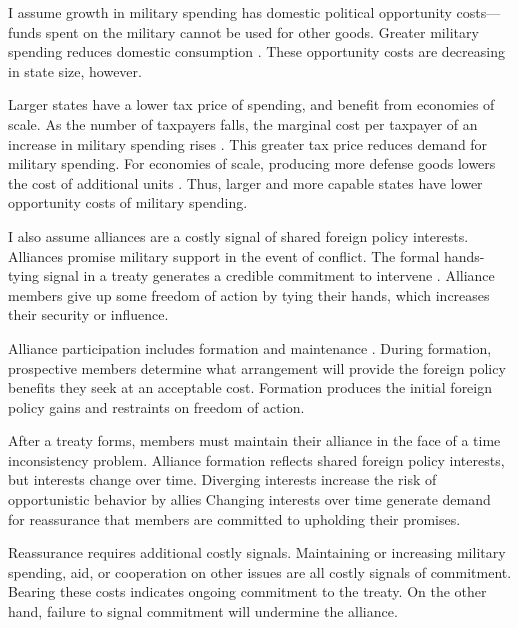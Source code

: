 \documentclass[12pt]{article}
\begin{document}
I assume growth in military spending has domestic political opportunity costs--- funds spent on the military cannot be used for other goods. 
Greater military spending reduces domestic consumption \citep{Fearon2018}. 
These opportunity costs are decreasing in state size, however. 


Larger states have a lower tax price of spending, and benefit from economies of scale. 
As the number of taxpayers falls, the marginal cost per taxpayer of an increase in military spending rises \citep{DudleyMontmarquette1981}. 
This greater tax price reduces demand for military spending. 
For economies of scale, producing more defense goods lowers the cost of additional units \citep{Moravcsik1991, AlesinaSpolaore2006}. 
Thus, larger and more capable states have lower opportunity costs of military spending. 


I also assume alliances are a costly signal of shared foreign policy interests. 
Alliances promise military support in the event of conflict. 
The formal hands-tying signal in a treaty generates a credible commitment to intervene \citep{Fearon1997, Leeds2003}.
Alliance members give up some freedom of action by tying their hands, which increases their security or influence. 


Alliance participation includes formation and maintenance \citep{Snyder1997}. 
During formation, prospective members determine what arrangement will provide the foreign policy benefits they seek at an acceptable cost. 
Formation produces the initial foreign policy gains and restraints on freedom of action. 


After a treaty forms, members must maintain their alliance in the face of a time inconsistency problem. 
Alliance formation reflects shared foreign policy interests, but interests change over time. 
Diverging interests increase the risk of opportunistic behavior by allies \citep{Leeds2003a, LeedsSavun2007}
Changing interests over time generate demand for reassurance that members are committed to upholding their promises. 


Reassurance requires additional costly signals. 
Maintaining or increasing military spending, aid, or cooperation on other issues are all costly signals of commitment. 
Bearing these costs indicates ongoing commitment to the treaty. 
On the other hand, failure to signal commitment will undermine the alliance. 
\end{document}
